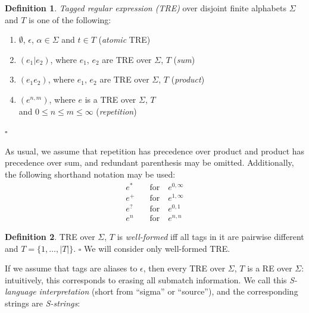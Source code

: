 \documentclass{article}
\newcommand{\Xin}{\!\in\!}
\newcommand{\Xeq}{\!=\!}
\theoremstyle{definition}
\newtheorem{Xdef}{Definition}
\begin{document}
\begin{multicols}{2}
    \begin{Xdef}\label{tre}
    \emph{Tagged regular expression (TRE)} over disjoint finite alphabets $\Sigma$ and $T$ is one of the following:
    \begin{enumerate}
        \medskip
        \item[] $\emptyset$, $\epsilon$, $\alpha \Xin \Sigma$ and $t \Xin T$ (\emph{atomic} TRE)
        \item[] $(e_1 | e_2)$, where $e_1$, $e_2$ are TRE over $\Sigma$, $T$ (\emph{sum})
        \item[] $(e_1 e_2)$,   where $e_1$, $e_2$ are TRE over $\Sigma$, $T$ (\emph{product})
        \item[] $(e^{n,m})$,   where $e$ is a TRE over $\Sigma$, $T$ \\
            \hphantom{\qquad} and $0 \!\leq\! n \!\leq\! m \!\leq\! \infty$ (\emph{repetition})
        \medskip
    \end{enumerate}
    $\square$
    \end{Xdef}

    As usual, we assume that repetition has precedence over product and product has precedence over sum,
    and redundant parenthesis may be omitted.
    Additionally, the following shorthand notation may be used:
    \begin{align*}
        e^*     &\quad\text{for}\quad e^{0,\infty} \\[-0.5em]
        e^+     &\quad\text{for}\quad e^{1,\infty} \\[-0.5em]
        e^?     &\quad\text{for}\quad e^{0,1} \\[-0.5em]
        e^n     &\quad\text{for}\quad e^{n,n}
    \end{align*}

    \begin{Xdef}
    TRE over $\Sigma$, $T$ is \emph{well-formed} iff
    all tags in it are pairwise different
    and $T \Xeq \{ 1, \dots, |T| \}$.
    $\square$
    We will consider only well-formed TRE.
    \end{Xdef}

If we assume that tags are aliases to $\epsilon$, then every TRE over $\Sigma$, $T$ is a RE over $\Sigma$:
intuitively, this corresponds to erasing all submatch information. 
We call this \emph{S-language interpretation} (short from ``sigma'' or ``source''),
and the corresponding strings are \emph{S-strings}:


\end{multicols}
\end{document}
